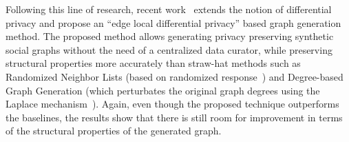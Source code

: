 Following this line of research, recent work~\cite{qin2017generating} extends the notion of differential privacy
and propose an ``edge local differential privacy'' based graph generation
method. The proposed method allows generating privacy preserving synthetic social
graphs without the need of a centralized data curator, while preserving structural
properties more accurately than straw-hat methods such as Randomized
Neighbor Lists (based on randomized response~\cite{dwork2014algorithmic}) and
Degree-based Graph Generation (which perturbates the original graph degrees
using the Laplace mechanism~\cite{dwork2009differential}). Again, even though the
proposed technique outperforms the baselines, the results show that there is
still room for improvement in terms of the structural properties of the
generated graph.
